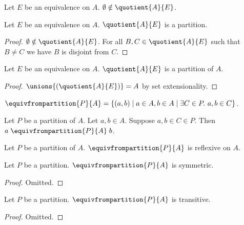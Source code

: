 \begin{corollary}\label{quotient_notni_emptyset}
    Let $E$ be an equivalence on $A$.
    $\emptyset\notin\quotient{A}{E}$.
\end{corollary}

\begin{proposition}\label{quotient_partition}
    Let $E$ be an equivalence on $A$.
    $\quotient{A}{E}$ is a partition.
\end{proposition}
\begin{proof}
    $\emptyset\notin\quotient{A}{E}$.
    For all $B, C\in \quotient{A}{E}$ such that $B\neq C$ we have $B$ is disjoint from $C$.
\end{proof}

\begin{proposition}\label{quotient_partition_of}
    Let $E$ be an equivalence on $A$.
    $\quotient{A}{E}$ is a partition of $A$.
\end{proposition}
\begin{proof}
    $\unions{(\quotient{A}{E})} = A$ by set extensionality.
\end{proof}



\begin{definition}\label{equivalence_from_partition}
    $\equivfrompartition{P}{A} = \{(a, b)\mid a\in A, b\in A\mid \exists C\in P.\ a, b\in C\}$.
\end{definition}

\begin{proposition}\label{equivalence_from_partition_intro}
    Let $P$ be a partition of $A$.
    Let $a,b\in A$.
    Suppose $a,b\in C\in P$.
    Then $a\mathrel{\equivfrompartition{P}{A}} b$.
\end{proposition}

\begin{proposition}\label{equivalence_from_partition_reflexive}
    Let $P$ be a partition of $A$.
    $\equivfrompartition{P}{A}$ is reflexive on $A$.
\end{proposition}

\begin{proposition}\label{equivalence_from_partition_symmetric}
    Let $P$ be a partition.
    $\equivfrompartition{P}{A}$ is symmetric.
\end{proposition}
\begin{proof}
    Omitted.
\end{proof}

\begin{proposition}\label{equivalence_from_partition_transitive}
    Let $P$ be a partition.
    $\equivfrompartition{P}{A}$ is transitive.
\end{proposition}
\begin{proof}
    Omitted.
\end{proof}

